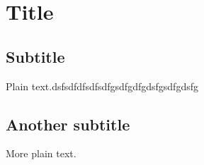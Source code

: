 \documentclass{article}
\begin{document}
\section{Title}

\subsection{Subtitle}

Plain text.dsfsdfdfsdfsdfgsdfgdfgdsfgsdfgdsfg

\subsection{Another subtitle}

More plain text.
\end{document}
